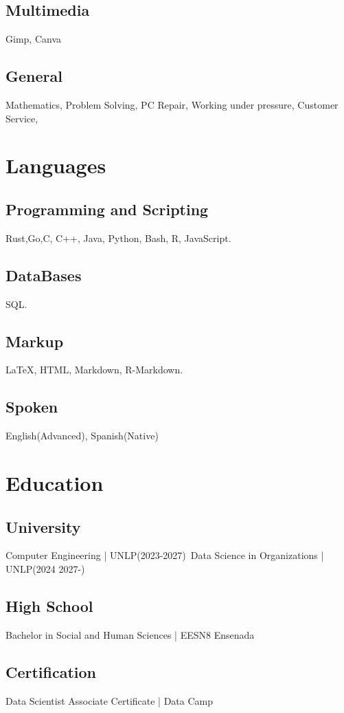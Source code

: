 \documentclass{article}
\begin{document}
\subsection{Multimedia}
Gimp, Canva
\subsection{General}
Mathematics,
Problem Solving, PC Repair,
Working under pressure, Customer Service,

\section{Languages}
\subsection{Programming and Scripting}
Rust,Go,C,  C++, Java, Python, Bash, R, JavaScript.
\subsection{DataBases}
SQL.
\subsection{Markup}
{\LaTeX}, HTML, Markdown, R-Markdown.
\subsection{Spoken}
English(Advanced), Spanish(Native)
\section{Education}
\subsection{University}
Computer Engineering | UNLP(2023-2027)\
Data Science in Organizations | UNLP(2024 2027-)
\subsection{High School}
Bachelor in Social and Human Sciences | EESN8 Ensenada
\subsection{Certification}
Data Scientist Associate Certificate | Data Camp
\end{document}
